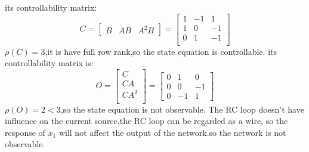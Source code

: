 \documentclass{article}
\begin{document}
its controllability matrix:
\[
C=
\left[
\begin{array}{cccc}
B & AB & A^2B
\end{array}
\right]   
=
\left[
    \begin{array}{ccc}
    1 & -1 & 1\\
    1 & 0 & -1\\
    0 & 1 & -1\\
    \end{array}
\right]
\]
$\rho(C)=3$,it is have full row rank,so the state equation is controllable.
its controllability matrix is:
\[
O=\left[
    \begin{array}{c}
        C\\
        CA\\
        CA^2\\
    \end{array}
\right]
=\left[
    \begin{array}{ccc}
    0 & 1 & 0\\
    0 & 0 & -1\\
    0 & -1 & 1
    \end{array}
\right]   
\]
$\rho(O)=2<3$,so the state equation is not observable.
The RC loop doesn't have influence on the current source,the RC loop can be regarded as 
a wire, so the response of $x_1$ will not affect the output of the network.so the network is not observable.  
\end{document}

